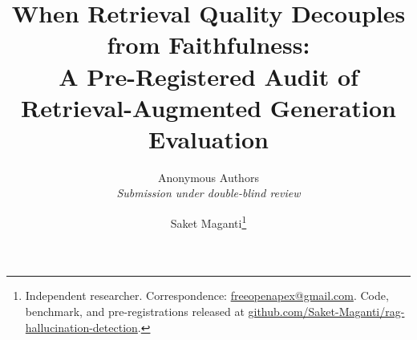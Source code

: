 \documentclass[10pt]{article}
\title{\Large\bfseries
When Retrieval Quality Decouples from Faithfulness:\\[0.2em]
A Pre-Registered Audit of Retrieval-Augmented Generation Evaluation}
\author{Anonymous Authors\\\textit{Submission under double-blind review}}
\author{%
    Saket Maganti\thanks{%
      Independent researcher.  Correspondence:
      \href{mailto:freeopenapex@gmail.com}{freeopenapex@gmail.com}.
      Code, benchmark, and pre-registrations released at
      \href{https://github.com/Saket-Maganti/rag-hallucination-detection}{github.com/Saket-Maganti/rag-hallucination-detection}.
    }
  }
\date{}
\theoremstyle{plain}
\theoremstyle{definition}
\begin{document}
\maketitle

\begin{abstract}

\end{abstract}


















\end{document}
